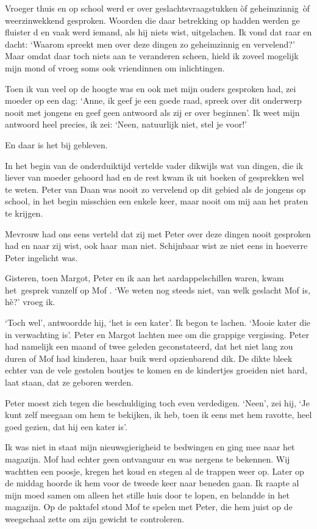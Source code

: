 \documentclass{book}
\begin{document}
Vroeger thuis en op school werd er over geslachtsvraagstukken òf geheimzinnig~òf
weerzinwekkend gesproken. Woorden die daar betrekking op hadden werden ge
fluister d en vaak werd iemand, als hij niets wist, uitgelachen. Ik vond dat
raar en dacht: `Waarom spreekt men over deze dingen zo geheimzinnig en
vervelend?' Maar omdat daar toch niets aan te veranderen scheen, hield ik zoveel
mogelijk mijn mond of vroeg soms ook vriendinnen om inlichtingen.

Toen ik van veel op de hoogte was en ook met mijn ouders gesproken had, zei
moeder op een dag: `Anne, ik geef je een goede raad, spreek over dit onderwerp
nooit met jongens en geef geen antwoord als zij er over beginnen'. Ik weet mijn
antwoord heel precies, ik zei: `Neen, natuurlijk niet, stel je voor!'

En daar is het bij gebleven.

In het begin van de onderduiktijd vertelde vader dikwijls wat van dingen, die ik
liever van moeder gehoord had en de rest kwam ik uit boeken of gesprekken wel te
weten. Peter van Daan was nooit zo vervelend op dit gebied als de jongens op
school, in het begin misschien een enkele keer, maar nooit om mij aan het praten
te krijgen.

Mevrouw had ons eens verteld dat zij met Peter over deze dingen nooit gesproken
had en naar zij wist, ook haar~man niet. Schijnbaar wist ze niet eens in
hoeverre Peter ingelicht was.

Gisteren, toen Margot, Peter en ik aan het aardappelschillen waren, kwam
het~gesprek vanzelf op Mof . `We weten nog steeds niet, van welk geslacht Mof
is, hè?' vroeg ik.

`Toch wel', antwoordde hij, `het is een kater'. Ik begon te lachen.  `Mooie
kater die in verwachting is'. Peter en Margot lachten mee om die grappige
vergissing. Peter had namelijk een maand of twee geleden geconstateerd, dat het
niet lang zou duren of Mof had kinderen, haar buik werd opzienbarend dik. De
dikte bleek echter van de vele gestolen boutjes te komen en de kindertjes
groeiden niet hard, laat staan, dat ze geboren werden.

Peter moest zich tegen die beschuldiging toch even verdedigen. `Neen', zei hij,
`Je kunt zelf meegaan om hem te bekijken, ik heb, toen ik eens met hem ravotte,
heel goed gezien, dat hij een kater is'.

Ik was niet in staat mijn nieuwsgierigheid te bedwingen en ging mee naar het
magazijn. Mof had echter geen ontvanguur en was nergens te bekennen.  Wij
wachtten een poosje, kregen het koud en stegen al de trappen weer op. Later op
de middag hoorde ik hem voor de tweede keer naar beneden gaan. Ik raapte al mijn
moed samen om alleen het stille huis door te lopen, en belandde in het magazijn.
Op de paktafel stond Mof te spelen met Peter, die hem juist op de weegschaal
zette om zijn gewicht te controleren.
\end{document}
